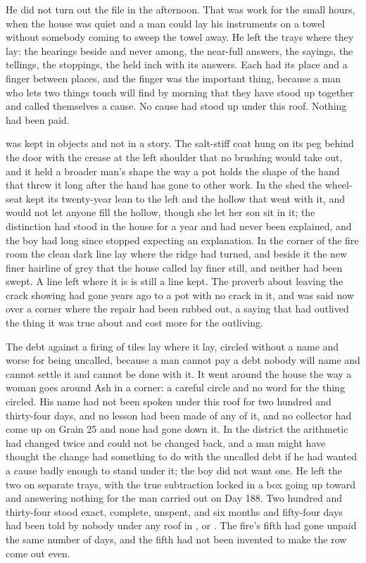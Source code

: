 He did not turn out the file in the afternoon. That was work for the small hours, when the house was quiet and a man could lay his instruments on a towel without somebody coming to sweep the towel away. He left the trays where they lay: the hearings beside and never among, the near-full answers, the sayings, the tellings, the stoppings, the held inch with its answers. Each had its place and a finger between places, and the finger was the important thing, because a man who lets two things touch will find by morning that they have stood up together and called themselves a cause. No cause had stood up under this roof. Nothing had been paid.

\scenebreak

 was kept in objects and not in a story. The salt-stiff coat hung on its peg behind the door with the crease at the left shoulder that no brushing would take out, and it held a broader man's shape the way a pot holds the shape of the hand that threw it long after the hand has gone to other work. In the shed the wheel-seat kept its twenty-year lean to the left and the hollow that went with it, and  would not let anyone fill the hollow, though she let her son sit in it; the distinction had stood in the house for a year and had never been explained, and the boy had long since stopped expecting an explanation. In the corner of the fire room the clean dark line lay where the  ridge had turned, and beside it the new finer hairline of grey that the house called  lay finer still, and neither had been swept. A line left where it is is still a line kept. The proverb about leaving the crack showing had gone years ago to a pot with no crack in it, and was said now over a corner where the repair had been rubbed out, a saying that had outlived the thing it was true about and cost more for the outliving.

The debt against a firing of tiles lay where it lay, circled without a name and worse for being uncalled, because a man cannot pay a debt nobody will name and cannot settle it and cannot be done with it. It went around the house the way a woman goes around Ash in a corner: a careful circle and no word for the thing circled. His name had not been spoken under this roof for two hundred and thirty-four days, and no lesson had been made of any of it, and no collector had come up  on Grain 25 and none had gone down it. In the district the arithmetic had changed twice and could not be changed back, and a man might have thought the change had something to do with the uncalled debt if he had wanted a cause badly enough to stand under it; the boy did not want one. He left the two on separate trays, with the true subtraction locked in a box going up toward  and answering nothing for the man carried out on Day 188. Two hundred and thirty-four stood exact, complete, unspent, and six months and fifty-four days had been told by nobody under any roof in ,  or . The fire's fifth had gone unpaid the same number of days, and the fifth had not been invented to make the row come out even.

